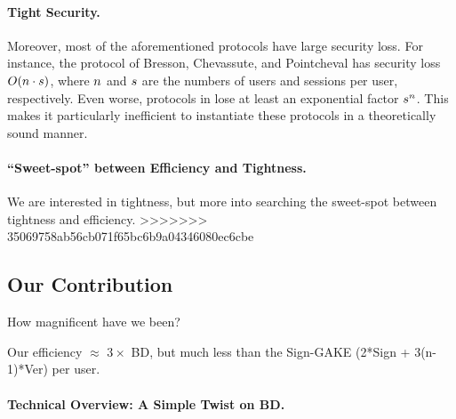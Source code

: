 

\paragraph{Tight Security.}
Moreover, most of the aforementioned protocols have large security loss. For instance, the protocol of Bresson, Chevassute, and Pointcheval \cite{AC:BreChePoi01} has security loss $O(n \cdot s)$, where $n$ and $s$ are the numbers of users and sessions per user, respectively. Even worse, protocols in \cite{CCS:BCPQ01,CANS:LiYan13} lose at least an exponential factor $s^{n}$. This makes it particularly inefficient to instantiate these protocols in a theoretically sound manner.


\paragraph{``Sweet-spot'' between Efficiency and Tightness.}
We are interested in tightness, but more into searching the sweet-spot between tightness and efficiency.
>>>>>>> 35069758ab56cb071f65bc6b9a04346080ec6cbe

\subsection{Our Contribution}
How magnificent have we been?

Our efficiency $\approx$ $3\times $ BD, but much less than the Sign-GAKE (2*Sign + 3(n-1)*Ver) per user.

\paragraph{Technical Overview: A Simple Twist on BD.}

